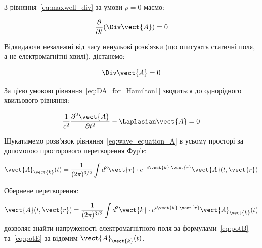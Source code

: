 З рівняння~\eqref{eq:maxwell_div} за умови \(\rho = 0\) маємо:

\begin{equation*}
	\frac{\partial}{\partial t} (\Div\vect{A}) = 0
\end{equation*}

Відкидаючи незалежні від часу ненульові розв'язки (що описують статичні поля, а не електромагнітні хвилі),
дістанемо:

\begin{equation}
	\Div\vect{A} = 0
	\label{eq:div_A_zero}
\end{equation}

За цією умовою рівняння~\eqref{eq:DA_for_Hamilton1} зводиться до однорідного хвильового рівняння:

\begin{equation}
	\frac{1}{c^2} \frac{\partial^2 \vect{A}}{\partial t^2} - \Laplasian \vect{A} = 0
	\label{eq:wave_equation_A}
\end{equation}

Шукатимемо розв'язок рівняння~\eqref{eq:wave_equation_A} в усьому просторі за допомогою просторового перетворення Фур'є:

\begin{equation}
	\vect{A}_{\vect{k}}(t) = \frac{1}{(2\pi)^{3/2}} \int d^3\vect{r} \cdot e^{-i\vect{k} \cdot \vect{r}} \vect{A}(t, \vect{r})
	\label{eq:fourier_transform_A}
\end{equation}

Обернене перетворення:

\begin{equation}
	\vect{A}(t, \vect{r}) = \frac{1}{(2\pi)^{3/2}} \int d^3\vect{k} \cdot e^{i\vect{k} \cdot \vect{r}} \vect{A}_{\vect{k}}(t)
	\label{eq:inverse_fourier_transform_A}
\end{equation}
дозволяє знайти напруженості електромагнітного поля за формулами~\eqref{eq:potB} та~\eqref{eq:potE} за відомим
\(\vect{A}_{\vect{k}}(t)\).

